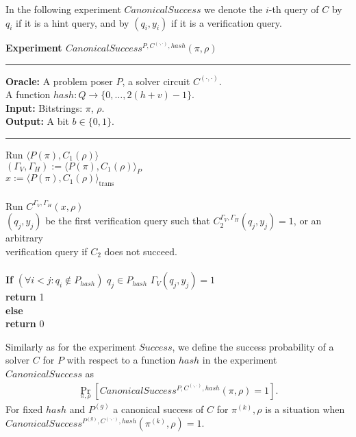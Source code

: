 In the following experiment $CanonicalSuccess$ we denote the $i$-th query of $C$ by $q_i$ if it is a hint query, and by $(q_i, y_i)$
if it is a verification query.
%
\begin{codeblock}
  \textbf{Experiment $CanonicalSuccess^{P, C^{(\cdot, \cdot)}, hash}(\pi, \rho)$}
  \medskip

  \hrule

  \medskip
  \textbf{Oracle:} A problem poser $P$, a solver circuit $C^{(\cdot, \cdot)}$.\\
  \IndII A function $hash: Q \rightarrow \{0, \dots, 2(h+v) - 1\}$.\\
  \textbf{Input:}  Bitstrings: $\pi$, $\rho$. \\
  \textbf{Output:} A bit $b \in \{0,1\}$.

  \medskip\hrule\medskip
  Run $\langle P(\pi), C_1(\rho) \rangle$ \\
  \IndI $(\Gamma_V, \Gamma_H) := \langle P(\pi), C_1(\rho) \rangle_{P}$ \\
  \IndI $x := \langle P(\pi), C_1(\rho) \rangle_{\text{trans}}$ \\ \\
  Run $C^{\Gamma_V, \Gamma_H} (x, \rho)$ \\
  \IndI $(q_j,y_j)$ be the first verification query such that $C_2^{\Gamma_V, \Gamma_H}(q_j, y_j) = 1$, or an arbitrary\\
  \IndI verification query if $C_2$ does not succeed.\\
  \\
  \textbf{If} $(\forall i < j :  q_i \notin P_{hash} )$ \And $q_j \in P_{hash}$ \And $\Gamma_V(q_j, y_j) = 1$ \then \\
  \IndI \textbf{return} 1\\
  \textbf{else}\\
  \IndI \textbf{return} 0
\end{codeblock}
%
Similarly as for the experiment $Success$, we define the success probability of a solver $C$ for $P$ with respect to a function $hash$
in the experiment $CanonicalSuccess$ as
%
\begin{align}
 \underset{\pi, \rho}{\Pr}[CanonicalSuccess^{P,C^{(\cdot, \cdot)},hash}(\pi, \rho) = 1].
\end{align}
%
For fixed $hash$ and $P^{(g)}$ a canonical success of $C$ for $\pi^{(k )}, \rho$ is a situation when \\ $CanonicalSuccess^{P^{(g)}, C^{(\cdot, \cdot)}, hash}(\pi^{(k)}, \rho) = 1$.

